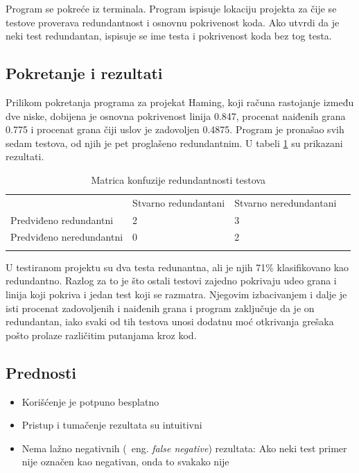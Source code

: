 \documentclass[a4paper]{article}
\begin{document}
Program se pokreće iz terminala. Program ispisuje lokaciju projekta za čije se testove proverava redundantnost i osnovnu pokrivenost koda.
Ako utvrdi da je neki test redundantan, ispisuje se ime testa i pokrivenost koda bez tog testa.

\subsection{Pokretanje i rezultati}
\label{subsec:pokretanje_rezultati}

Prilikom pokretanja programa za projekat Haming, koji računa rastojanje između dve niske, dobijena je osnovna pokrivenost 
linija 0.847, procenat naiđenih grana 0.775 i procenat grana čiji uslov je zadovoljen 0.4875. 
Program je pronašao svih sedam testova, od njih je pet proglašeno redundantnim. 
U tabeli \ref{tab:tabela} su prikazani rezultati.

\begin{table}[!htbp]
    \centering
    \begin{tabular}{llll}
        & Stvarno redundantani & Stvarno neredundantani &   \\
        Predviđeno redundantni  & 2 & 3 &   \\
        Predviđeno neredundantni & 0 & 2 &   \\
        &   &   &  
    \end{tabular}
    \caption{Matrica konfuzije redundantnosti testova}
    \label{tab:tabela}
\end{table}

U testiranom projektu su dva testa redunantna, ali je njih 71\% klasifikovano kao redundantno.
Razlog za to je što ostali testovi zajedno pokrivaju udeo grana i linija koji pokriva i jedan test koji se razmatra.
Njegovim izbacivanjem i dalje je isti procenat zadovoljenih i naiđenih grana i program zaključuje da je on redundantan, iako svaki od tih 
testova unosi dodatnu moć otkrivanja grešaka pošto prolaze različitim putanjama kroz kod.

\subsection{Prednosti}
\label{subsec:prednosti}
\begin{itemize}
    \item Korišćenje je potpuno besplatno
    \item Pristup i tumačenje rezultata su intuitivni
    \item Nema lažno negativnih (~eng. \textit{false negative}) rezultata: Ako neki test primer nije označen kao negativan, onda to svakako nije
\end{itemize}
    
\end{document}

